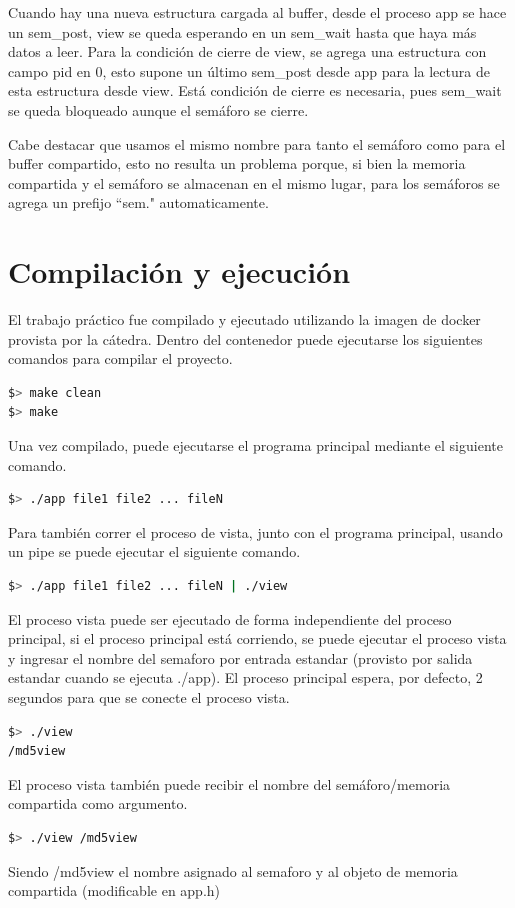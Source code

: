 \documentclass{article}
\begin{document}
Cuando hay una nueva estructura cargada al buffer, desde el proceso app se hace un sem\_post, view se queda esperando en un sem\_wait hasta que haya más datos a leer. Para la condición de cierre de view, se agrega una estructura con campo pid en 0, esto supone un último sem\_post desde app para la lectura de esta estructura desde view. Está condición de cierre es necesaria, pues sem\_wait se queda bloqueado aunque el semáforo se cierre.

Cabe destacar que usamos el mismo nombre para tanto el semáforo como para el buffer compartido, esto no resulta un problema porque, si bien la memoria compartida y el semáforo se almacenan en el mismo lugar, para los semáforos se agrega un prefijo ``sem." automaticamente.

\section{Compilación y ejecución}

El trabajo práctico fue compilado y ejecutado utilizando la imagen de docker provista por la cátedra. Dentro del contenedor puede ejecutarse los siguientes comandos para compilar el proyecto.

\begin{lstlisting}[language=bash]
$> make clean
$> make
\end{lstlisting}
Una vez compilado, puede ejecutarse el programa principal mediante el siguiente comando.

\begin{lstlisting}[language=bash]
$> ./app file1 file2 ... fileN
\end{lstlisting}
Para también correr el proceso de vista, junto con el programa principal, usando un pipe se puede ejecutar el siguiente comando.
\begin{lstlisting}[language=bash]
$> ./app file1 file2 ... fileN | ./view
\end{lstlisting}
El proceso vista puede ser ejecutado de forma independiente del proceso principal, si el proceso principal está corriendo, se puede ejecutar el proceso vista y ingresar el nombre del semaforo  por entrada estandar (provisto por salida estandar cuando se ejecuta ./app). El proceso principal espera, por defecto, 2 segundos para que se conecte el proceso vista.
\begin{lstlisting}[language=bash]
$> ./view
/md5view
\end{lstlisting}
El proceso vista también puede recibir el nombre del semáforo/memoria compartida como argumento.
\begin{lstlisting}[language=bash]
$> ./view /md5view
\end{lstlisting}
Siendo /md5view el nombre asignado al semaforo y al objeto de memoria compartida (modificable en app.h)
\end{document}
